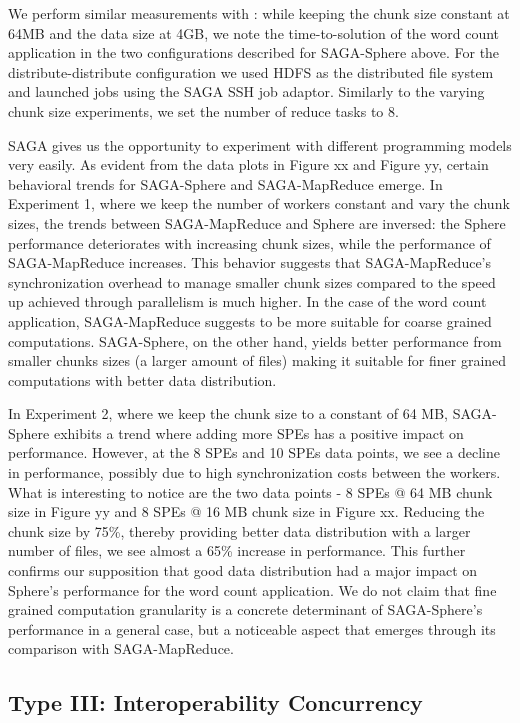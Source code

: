 \documentclass[3p,twocolumn]{elsarticle}
\begin{document}
We perform similar measurements with \sagamapreduce: while keeping the
chunk size constant at 64MB and the data size at 4GB, we note the
time-to-solution of the word count application in the two
configurations described for SAGA-Sphere above.  For the
distribute-distribute configuration we used HDFS as the distributed
file system and launched jobs using the SAGA SSH job adaptor.
Similarly to the varying chunk size experiments, we set the number of
reduce tasks to 8.  

SAGA gives us the opportunity to experiment with different programming models very easily. 
As evident from the data plots in Figure xx and Figure yy, certain behavioral 
trends for SAGA-Sphere and SAGA-MapReduce emerge.  In Experiment 1, where we keep the 
number of workers constant and vary the chunk sizes, the trends between 
SAGA-MapReduce and Sphere are inversed: the Sphere performance deteriorates with 
increasing chunk sizes, while the performance of SAGA-MapReduce increases. This behavior
suggests that SAGA-MapReduce's synchronization overhead to manage smaller 
chunk sizes compared to the speed up achieved through parallelism is much higher. 
In the case of the word count application, SAGA-MapReduce suggests to be more 
suitable for coarse grained computations. SAGA-Sphere, on the other hand, yields 
better performance from smaller chunks sizes (a larger amount of files) making it 
suitable for finer grained computations with better data distribution.

In Experiment 2, where we keep the chunk size to a constant of 64 MB, SAGA-Sphere 
exhibits a trend where adding more SPEs has a positive impact on performance. However, 
at the 8 SPEs and 10 SPEs data points, we see a decline in performance, possibly 
due to high synchronization costs between the workers. What is interesting to 
notice are the two data points - 8 SPEs @ 64 MB chunk size in Figure yy 
and 8 SPEs @ 16 MB chunk size in Figure xx. Reducing the chunk size by 75\%, 
thereby providing better data distribution with a larger number of files, we 
see almost a 65\% increase in performance. This further confirms our 
supposition that good data distribution had a major impact on Sphere's performance for
the word count application. We do not claim that fine grained computation 
granularity is a concrete determinant of SAGA-Sphere's performance in a 
general case, but a noticeable aspect that emerges through its comparison with SAGA-MapReduce. 


\subsection{Type  III: Interoperability Concurrency}
\end{document}
